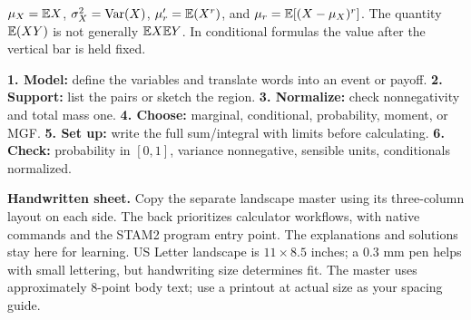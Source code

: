 $\mu_X=\mathbb E X$, $\sigma_X^2=\operatorname{Var}(X)$, $\mu'_r=\mathbb E(X^r)$, and $\mu_r=\mathbb E[(X-\mu_X)^r]$. The quantity $\mathbb E(XY)$ is not generally $\mathbb E X\mathbb E Y$. In conditional formulas the value after the vertical bar is held fixed.

\begin{insight}
\textbf{1. Model:} define the variables and translate words into an event or payoff.\quad
\textbf{2. Support:} list the pairs or sketch the region.\quad
\textbf{3. Normalize:} check nonnegativity and total mass one.\quad
\textbf{4. Choose:} marginal, conditional, probability, moment, or MGF.\quad
\textbf{5. Set up:} write the full sum/integral with limits before calculating.\quad
\textbf{6. Check:} probability in $[0,1]$, variance nonnegative, sensible units, conditionals normalized.
\end{insight}

\textbf{Handwritten sheet.} Copy the separate landscape master using its three-column layout on each side. The back prioritizes calculator workflows, with native commands and the STAM2 program entry point. The explanations and solutions stay here for learning. US Letter landscape is $11\times8.5$ inches; a 0.3 mm pen helps with small lettering, but handwriting size determines fit. The master uses approximately 8-point body text; use a printout at actual size as your spacing guide.
